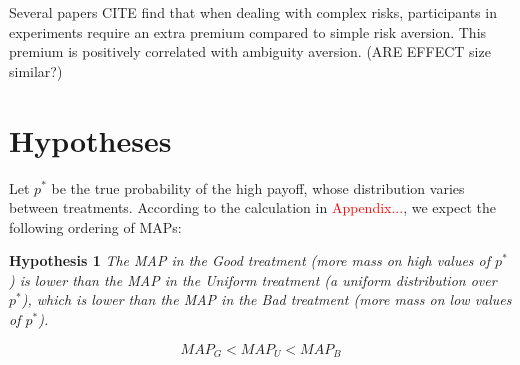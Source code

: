 Several papers CITE find that when dealing with complex risks, participants in experiments require an extra premium compared to simple risk aversion.
This premium is positively correlated with ambiguity aversion. (ARE EFFECT size similar?)


\section{Hypotheses}\label{sec:hyp}
Let $p^*$ be the true probability of the high payoff, whose distribution varies between treatments.
According to the calculation in \textcolor{red}{Appendix...}, we expect the following ordering of MAPs:

\noindent \textbf{Hypothesis 1} \quad \textit{The MAP in the Good treatment (more mass on high values of $p^*$) is lower than the MAP in the Uniform treatment (a uniform distribution over $p^*$), which is lower than the MAP in the Bad treatment (more mass on low values of $p^*$).}

\begin{equation}
MAP_G < MAP_U < MAP_B
\end{equation}


\clearpage
\pagebreak



